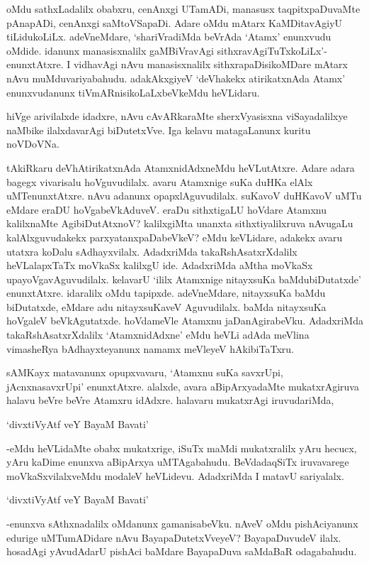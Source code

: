 oMdu sathxLadalilx obabxru, cenAnxgi UTamADi, manasusx taqpitxpaDuvaMte pAnapADi, cenAnxgi saMtoVSapaDi. Adare oMdu mAtarx KaMDitavAgiyU tiLidukoLiLx. adeVneMdare, `shariVradiMda beVrAda `Atamx' enunxvudu oMdide. idanunx manasisxnalilx gaMBiVravAgi sithxravAgiTuTxkoLiLx'-enunxtAtxre. I vidhavAgi nAvu manasisxnalilx sithxrapaDisikoMDare mAtarx nAvu muMduvariyabahudu. adakAkxgiyeV `deVhakekx atirikatxnAda Atamx' enunxvudanunx tiVmARnisikoLaLxbeVkeMdu heVLidaru.

hiVge arivilalxde idadxre, nAvu cAvARkaraMte sherxVyasisxna viSayadalilxye naMbike ilalxdavarAgi biDutetxVve. Iga kelavu matagaLanunx kuritu noVDoVNa.

tAkiRkaru deVhAtirikatxnAda AtamxnidAdxneMdu heVLutAtxre. Adare adara bagegx vivarisalu hoVguvudilalx. avaru Atamxnige suKa duHKa elAlx uMTenunxtAtxre. nAvu adanunx opapxlAguvudilalx. suKavoV duHKavoV uMTu eMdare eraDU hoVgabeVkAduveV. eraDu sithxtigaLU hoVdare Atamxnu kalilxnaMte AgibiDutAtxnoV? kalilxgiMta unanxta sithxtiyalilxruva nAvugaLu kalAlxguvudakekx  parxyatanxpaDabeVkeV? eMdu keVLidare, adakekx avaru utatxra koDalu sAdhayxvilalx. AdadxriMda takaRshAsatxrXdalilx heVLalapxTaTx moVkaSx kalilxgU ide. AdadxriMda aMtha moVkaSx upayoVgavAguvudilalx. kelavarU `ililx Atamxnige nitayxsuKa baMdubiDutatxde' enunxtAtxre. idaralilx oMdu tapipxde. adeVneMdare, nitayxsuKa baMdu biDutatxde, eMdare adu nitayxsuKaveV Aguvudilalx. baMda nitayxsuKa hoVgaleV beVkAgutatxde. hoVdameVle Atamxnu jaDanAgirabeVku. AdadxriMda takaRshAsatxrXdalilx `AtamxnidAdxne' eMdu heVLi adAda meVlina vimasheRya bAdhayxteyanunx namamx meVleyeV hAkibiTaTxru.   

sAMKayx matavanunx opupxvavaru, `Atamxnu suKa savxrUpi, jAcnxnasavxrUpi' enunxtAtxre. alalxde, avara aBipArxyadaMte mukatxrAgiruva halavu beVre beVre Atamxru idAdxre. halavaru mukatxrAgi iruvudariMda,

\begin{shloka}
`divxtiVyAtf veY BayaM Bavati'
\end{shloka}

-eMdu heVLidaMte obabx mukatxrige, iSuTx maMdi mukatxralilx yAru hecucx, yAru kaDime enunxva aBipArxya uMTAgabahudu. BeVdadaqSiTx iruvavarege moVkaSxvilalxveMdu modaleV heVLidevu. AdadxriMda I matavU sariyalalx.

\begin{shloka}
`divxtiVyAtf veY BayaM Bavati'
\end{shloka}

-enunxva sAthxnadalilx oMdanunx gamanisabeVku. nAveV oMdu pishAciyanunx edurige uMTumADidare nAvu BayapaDutetxVveyeV? BayapaDuvudeV ilalx. hosadAgi yAvudAdarU pishAci baMdare BayapaDuva saMdaBaR odagabahudu.


